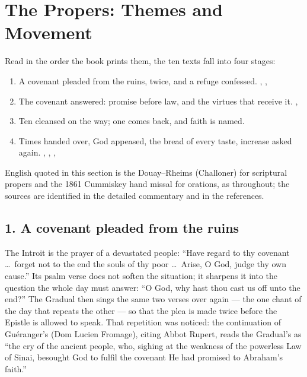 \sectionguard
\section*{The Propers: Themes and Movement}
\label{triptych:brief-synthesis:start}


Read in the order the book prints them, the ten texts fall into four stages:

\begin{enumerate}[leftmargin=1.5em, itemsep=0.1em]
  \item A covenant pleaded from the ruins, twice, and a refuge confessed. , , 
  \item The covenant answered: promise before law, and the virtues that receive it. , 
  \item Ten cleansed on the way; one comes back, and faith is named. 
  \item Times handed over, God appeased, the bread of every taste, increase asked again. , , , 
\end{enumerate}

English quoted in this section is the Douay--Rheims (Challoner) for scriptural
propers and the 1861 Cummiskey hand missal for orations, as throughout; the
sources are identified in the detailed commentary and in the references.

\subsection*{1. A covenant pleaded from the ruins}

The Introit is the prayer of a devastated people: ``Have regard to thy
covenant \dots\ forget not to the end the souls of thy poor \dots\ Arise, O
God, judge thy own cause.'' Its psalm verse does not soften the situation; it
sharpens it into the question the whole day must answer: ``O God, why hast
thou cast us off unto the end?'' The Gradual then sings the same two verses
over again --- the one chant of the day that repeats the other --- so that the
plea is made twice before the Epistle is allowed to speak. That repetition was
noticed: the continuation of Guéranger's  (Dom Lucien
Fromage), citing Abbot Rupert, reads the Gradual's
 as ``the cry of the ancient
people, who, sighing at the weakness of the powerless Law of Sinai, besought
God to fulfil the covenant He had promised to Abraham's faith.''

